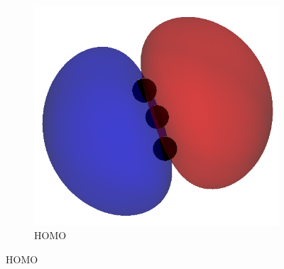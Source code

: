 \documentclass[12pt]{article}
\begin{document}
\begin{figure}[H]
\begin{subfigure}[b]{0.25\textwidth}
        \includegraphics[width=\textwidth]{figures/h2o_homo.png}
        \caption{ HOMO}
    \end{subfigure}

    \vspace{1em}
    

\end{figure}
\end{document}
